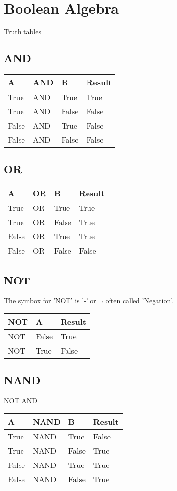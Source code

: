 \documentclass[11pt]{article}
\begin{document}
\section{Boolean Algebra}
Truth tables

\subsection{AND}
\begin{tabular}{lll|l}
A & AND & B & Result \\
\hline
True & AND & True & True \\
True & AND & False & False \\
False & AND & True & False \\
False & AND & False & False \\
\hline
\end{tabular}

\subsection{OR}
\begin{tabular}{lll|l}
A & OR &B & Result \\
\hline
True & OR & True & True \\
True & OR & False & True \\
False & OR & True & True \\
False & OR & False & False \\
\hline
\end{tabular}

\subsection{NOT}
The symbox for 'NOT' is '-' or $\neg$ often called 'Negation'.

\begin{tabular}{ll|l}
NOT & A & Result \\
\hline
NOT & False & True \\
NOT & True & False \\

\hline
\end{tabular}


\subsection{NAND}
NOT AND

\begin{tabular}{lll|l}
A & NAND & B & Result \\
\hline
True & NAND & True & False \\
True & NAND & False & True \\
False & NAND & True & True \\
False & NAND & False & True \\
\hline
\end{tabular}
\end{document}
